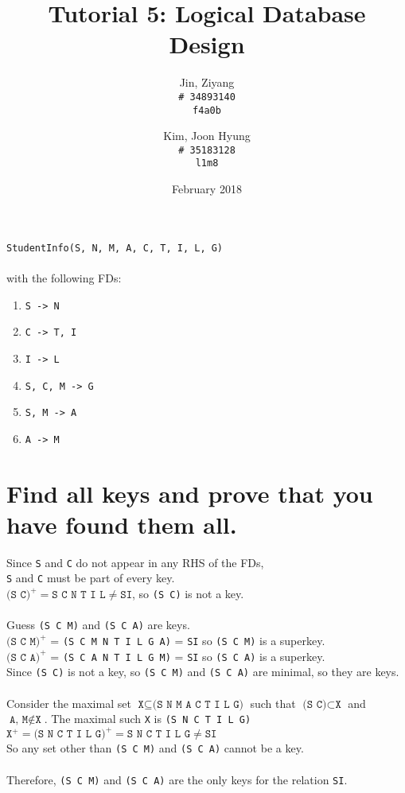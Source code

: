 \documentclass{article}
\title{Tutorial 5: Logical Database Design}
\author{
	Jin, Ziyang\\
	\texttt{\# 34893140}\\
	\texttt{f4a0b}
	\and
	Kim, Joon Hyung\\
	\texttt{\# 35183128}\\
	\texttt{l1m8}
}
\date{February 2018}
\begin{document}
	\maketitle
	\texttt{StudentInfo(S, N, M, A, C, T, I, L, G)}\\
	\\
	with the following FDs:
	\begin{enumerate}
		\item \texttt{S -> N}
		\item \texttt{C -> T, I}
		\item \texttt{I -> L}
		\item \texttt{S, C, M -> G}
		\item \texttt{S, M -> A}
		\item \texttt{A -> M}
	\end{enumerate}
	
\section{Find all keys and prove that you have found them all.}

Since \texttt{S} and \texttt{C} do not appear in any RHS of the FDs, \\
\texttt{S} and \texttt{C} must be part of every key. \\
\( \texttt{(S C)}^+ = \texttt{S C N T I L} \neq \texttt{SI} \), so \texttt{(S C)} is not a key.\\
\\
Guess \texttt{(S C M)} and \texttt{(S C A)} are keys. \\
\( \texttt{(S C M)}^+ \) = \texttt{(S C M N T I L G A)} = \texttt{SI} so \texttt{(S C M)} is a superkey.\\
\( \texttt{(S C A)}^+ \) = \texttt{(S C A N T I L G M)} = \texttt{SI} so \texttt{(S C A)} is a superkey.\\
Since \texttt{(S C)} is not a key, so \texttt{(S C M)} and \texttt{(S C A)} are minimal, so they are keys. \\
\\
Consider the maximal set \( \texttt{X}  \subseteq \texttt{(S N M A C T I L G)} \) such that \( \texttt{(S C)} \subset \texttt{X}\) and \( \texttt{A, M} \notin \texttt{X} \). The maximal such \texttt{X} is \texttt{(S N C T I L G)} \\
\( \texttt{X}^+ = \texttt{(S N C T I L G)}^+ = \texttt{S N C T I L G} \neq \texttt{SI} \)\\
So any set other than \texttt{(S C M)} and \texttt{(S C A)} cannot be a key.\\
\\
Therefore, \texttt{(S C M)} and \texttt{(S C A)} are the only keys for the relation \texttt{SI}.\\
\end{document}
